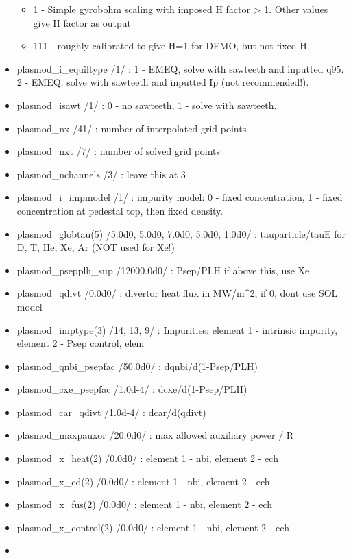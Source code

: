 \documentclass[
]{article}
\providecommand{\tightlist}{%
  \setlength{\itemsep}{0pt}\setlength{\parskip}{0pt}}
\begin{document}
\begin{itemize}
  \begin{itemize}
  \tightlist
  \item
    1 - Simple gyrobohm scaling with imposed H factor \textgreater{} 1.
    Other values give H factor as output
  \item
    111 - roughly calibrated to give H=1 for DEMO, but not fixed H
  \end{itemize}
\item
  plasmod\_i\_equiltype /1/ : 1 - EMEQ, solve with sawteeth and inputted
  q95. 2 - EMEQ, solve with sawteeth and inputted Ip (not recommended!).
\item
  plasmod\_isawt /1/ : 0 - no sawteeth, 1 - solve with sawteeth.
\item
  plasmod\_nx /41/ : number of interpolated grid points
\item
  plasmod\_nxt /7/ : number of solved grid points
\item
  plasmod\_nchannels /3/ : leave this at 3
\item
  plasmod\_i\_impmodel /1/ : impurity model: 0 - fixed concentration, 1
  - fixed concentration at pedestal top, then fixed density.
\item
  plasmod\_globtau(5) /5.0d0, 5.0d0, 7.0d0, 5.0d0, 1.0d0/ :
  tauparticle/tauE for D, T, He, Xe, Ar (NOT used for Xe!)
\item
  plasmod\_psepplh\_sup /12000.0d0/ : Psep/PLH if above this, use Xe
\item
  plasmod\_qdivt /0.0d0/ : divertor heat flux in MW/m\^{}2, if 0, dont
  use SOL model
\item
  plasmod\_imptype(3) /14, 13, 9/ : Impurities: element 1 - intrinsic
  impurity, element 2 - Psep control, elem
\item
  plasmod\_qnbi\_psepfac /50.0d0/ : dqnbi/d(1-Psep/PLH)
\item
  plasmod\_cxe\_psepfac /1.0d-4/ : dcxe/d(1-Psep/PLH)
\item
  plasmod\_car\_qdivt /1.0d-4/ : dcar/d(qdivt)
\item
  plasmod\_maxpauxor /20.0d0/ : max allowed auxiliary power / R
\item
  plasmod\_x\_heat(2) /0.0d0/ : element 1 - nbi, element 2 - ech
\item
  plasmod\_x\_cd(2) /0.0d0/ : element 1 - nbi, element 2 - ech
\item
  plasmod\_x\_fus(2) /0.0d0/ : element 1 - nbi, element 2 - ech
\item
  plasmod\_x\_control(2) /0.0d0/ : element 1 - nbi, element 2 - ech
\item

\end{itemize}
\end{document}
